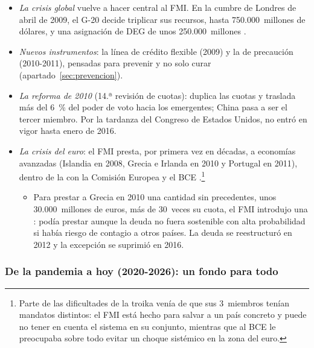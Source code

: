 \documentclass[11pt]{article}
\begin{document}
\begin{itemize}
\item \emph{La crisis global} vuelve a hacer central al FMI. En la cumbre de Londres de abril de 2009, el G-20 decide triplicar sus recursos, hasta 750.000~millones de dólares, y una asignación de DEG de unos 250.000~millones\nocite{ReinhartTrebesch2016} .
\item \emph{Nuevos instrumentos}: la línea de crédito flexible (2009) y la de precaución (2010-2011), pensadas para prevenir y no solo curar (apartado~\ref{sec:prevencion})\nocite{FMI2026Prestamos}.
\item \emph{La reforma de 2010} (14.ª revisión de cuotas): duplica las cuotas y traslada más del 6~\% del poder de voto hacia los emergentes; China pasa a ser el tercer miembro. Por la tardanza del Congreso de Estados Unidos, no entró en vigor hasta enero de 2016\nocite{ReinhartTrebesch2016}.
\item \emph{La crisis del euro}: el FMI presta, por primera vez en décadas, a economías avanzadas (Islandia en 2008, Grecia e Irlanda en 2010 y Portugal en 2011), dentro de la  con la Comisión Europea y el BCE .\footnote{Parte de las dificultades de la troika venía de que sus 3~miembros tenían mandatos distintos: el FMI está hecho para salvar a un país concreto y puede no tener en cuenta el sistema en su conjunto, mientras que al BCE le preocupaba sobre todo evitar un choque sistémico en la zona del euro.}
  \begin{itemize}
  \item Para prestar a Grecia en 2010 una cantidad sin precedentes, unos 30.000~millones de euros, más de 30~veces su cuota, el FMI introdujo una : podía prestar aunque la deuda no fuera sostenible con alta probabilidad si había riesgo de contagio a otros países. La deuda se reestructuró en 2012 y la excepción se suprimió en 2016\nocite{FMI2013GreciaExPost,IEO2016Euro}.
  \end{itemize}
\end{itemize}

\subsubsection{De la pandemia a hoy (2020-2026): un fondo para todo}\label{sec:pandemia}
\end{document}
